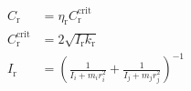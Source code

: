 \documentclass[12pt]{article}
\begin{document}
\begin{align}
 C_\mathrm{r} & = \eta_\mathrm{r} C_\mathrm{r}^\mathrm{crit} \\
 C_\mathrm{r}^\mathrm{crit} & = 2 \sqrt{I_\mathrm{r} k_\mathrm{r}} \\
 I_\mathrm{r} & = \left( \frac{1}{I_i + m_i r_i^2} + \frac{1}{I_j + m_j r_j^2} \right)^{-1}
\end{align}
\end{document}
